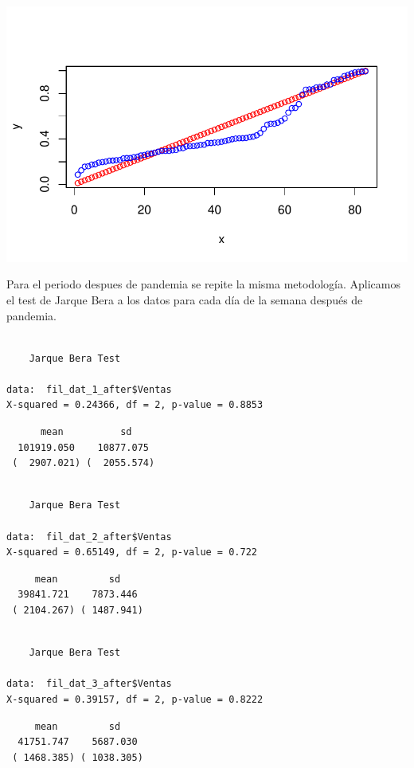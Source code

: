 \documentclass[
  us-letterpaper,
]{scrreprt}
\theoremstyle{definition}
\theoremstyle{plain}
\theoremstyle{plain}
\theoremstyle{remark}
\begin{document}
\includegraphics{Estudio_caso_files/figure-pdf/unnamed-chunk-27-3.pdf}

Para el periodo despues de pandemia se repite la misma metodología.
Aplicamos el test de Jarque Bera a los datos para cada día de la semana
después de pandemia.

\begin{verbatim}

    Jarque Bera Test

data:  fil_dat_1_after$Ventas
X-squared = 0.24366, df = 2, p-value = 0.8853
\end{verbatim}

\begin{verbatim}
      mean          sd    
  101919.050    10877.075 
 (  2907.021) (  2055.574)
\end{verbatim}

\begin{verbatim}

    Jarque Bera Test

data:  fil_dat_2_after$Ventas
X-squared = 0.65149, df = 2, p-value = 0.722
\end{verbatim}

\begin{verbatim}
     mean         sd    
  39841.721    7873.446 
 ( 2104.267) ( 1487.941)
\end{verbatim}

\begin{verbatim}

    Jarque Bera Test

data:  fil_dat_3_after$Ventas
X-squared = 0.39157, df = 2, p-value = 0.8222
\end{verbatim}

\begin{verbatim}
     mean         sd    
  41751.747    5687.030 
 ( 1468.385) ( 1038.305)
\end{verbatim}
\end{document}
